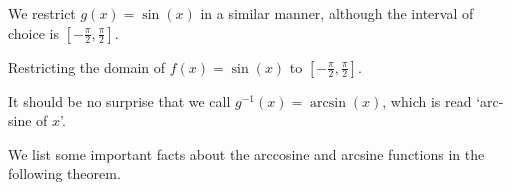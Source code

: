
We restrict $g(x) = \sin(x)$ in a similar manner, although the interval of choice is $\left[ -\frac{\pi}{2}, \frac{\pi}{2}\right]$.

\medskip

\noindent\begin{minipage}{\textwidth}
\begin{center}
\end{center}
\captionsetup{type=figure}
\caption{Restricting the domain of $f(x) = \sin(x)$ to $\left[-\frac{\pi}{2}, \frac{\pi}{2}\right]$.}
\label{fig:arctrig3}
\end{minipage}

\medskip

It should be no surprise that we call $g^{-1}(x) = \arcsin(x)$, which is read `arc-sine of $x$'. 


We list some important facts about the arccosine and arcsine functions in the following theorem. 

\smallskip

